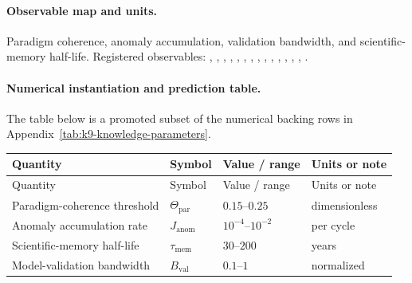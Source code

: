 \paragraph{Observable map and units.}
Paradigm coherence, anomaly accumulation, validation bandwidth, and scientific-memory half-life.
Registered observables: , \allowbreak {}, \allowbreak {}, \allowbreak {}, \allowbreak {}, \allowbreak {}, \allowbreak {}, \allowbreak {}, \allowbreak {}, \allowbreak {}, \allowbreak {}, \allowbreak {}, \allowbreak {}, \allowbreak {}, \allowbreak {}.

\paragraph{Numerical instantiation and prediction table.}
The table below is a promoted subset of the numerical backing rows in Appendix~\ref{tab:k9-knowledge-parameters}.
\begin{longtable}{@{}L{0.27\textwidth}L{0.15\textwidth}L{0.24\textwidth}L{0.16\textwidth}@{}}
\toprule
Quantity & Symbol & Value / range & Units or note \\
\midrule
\endfirsthead
\toprule
Quantity & Symbol & Value / range & Units or note \\
\midrule
\endhead
Paradigm-coherence threshold & $\scriptstyle \Theta_{\mathrm{par}}$ & $0.15\text{--}0.25$ & dimensionless \\
Anomaly accumulation rate & $\scriptstyle J_{\mathrm{anom}}$ & $10^{-4}\text{--}10^{-2}$ & per cycle \\
Scientific-memory half-life & $\scriptstyle \tau_{\mathrm{mem}}$ & $30\text{--}200$ & years \\
Model-validation bandwidth & $\scriptstyle B_{\mathrm{val}}$ & $0.1\text{--}1$ & normalized \\
\bottomrule
\end{longtable}

